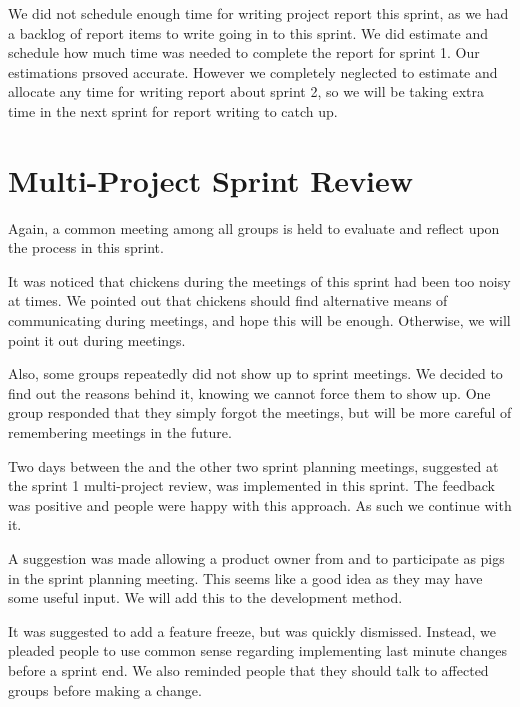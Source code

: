 We did not schedule enough time for writing project report this sprint, as we had a backlog of report items to write going in to this sprint. We did estimate and schedule how much time was needed to complete the report for sprint 1. Our estimations prsoved accurate. However we completely neglected to estimate and allocate any time for writing report about sprint 2, so we will be taking extra time in the next sprint for report writing to catch up.


\section{Multi-Project Sprint Review}\label{sec:s2_multiprj_review}
Again, a common meeting among all groups is held to evaluate and reflect upon the process in this sprint.

It was noticed that chickens during the meetings of this sprint had been too noisy at times. We pointed out that chickens should find alternative means of communicating during meetings, and hope this will be enough. Otherwise, we will point it out during meetings.

Also, some groups repeatedly did not show up to sprint meetings. We decided to find out the reasons behind it, knowing we cannot force them to show up. One group responded that they simply forgot the meetings, but will be more careful of remembering meetings in the future.

Two days between the \gui and the other two sprint planning meetings, suggested at the sprint 1 multi-project review, was implemented in this sprint. The feedback was positive and people were happy with this approach. As such we continue with it.

A suggestion was made allowing a product owner from \db and \bd to participate as pigs in the \gui sprint planning meeting. This seems like a good idea as they may have some useful input. We will add this to the development method.

It was suggested to add a feature freeze, but was quickly dismissed. Instead, we pleaded people to use common sense regarding implementing last minute changes before a sprint end. We also reminded people that they should talk to affected groups before making a change.